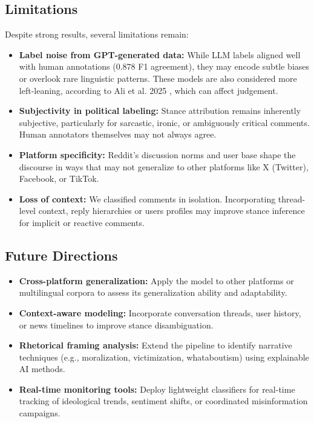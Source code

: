 \documentclass[letterpaper]{article} %
\begin{document}
\subsection{Limitations}

Despite strong results, several limitations remain:
\begin{itemize}
\item \textbf{Label noise from GPT-generated data:} While LLM labels aligned well with human annotations (0.878 F1 agreement), they may encode subtle biases or overlook rare linguistic patterns. These models are also considered more left-leaning, according to Ali et al. 2025 \cite{ali2025social}, which can affect judgement.
\item \textbf{Subjectivity in political labeling:} Stance attribution remains inherently subjective, particularly for sarcastic, ironic, or ambiguously critical comments. Human annotators themselves may not always agree.
\item \textbf{Platform specificity:} Reddit’s discussion norms and user base shape the discourse in ways that may not generalize to other platforms like X (Twitter), Facebook, or TikTok.
\item \textbf{Loss of context:} We classified comments in isolation. Incorporating thread-level context, reply hierarchies or users profiles may improve stance inference for implicit or reactive comments.
\end{itemize}

\subsection{Future Directions}

\begin{itemize}
\item \textbf{Cross-platform generalization:} Apply the model to other platforms or multilingual corpora to assess its generalization ability and adaptability.
\item \textbf{Context-aware modeling:} Incorporate conversation threads, user history, or news timelines to improve stance disambiguation.
\item \textbf{Rhetorical framing analysis:} Extend the pipeline to identify narrative techniques (e.g., moralization, victimization, whataboutism) using explainable AI methods.
\item \textbf{Real-time monitoring tools:} Deploy lightweight classifiers for real-time tracking of ideological trends, sentiment shifts, or coordinated misinformation campaigns.
\end{itemize}
\end{document}

